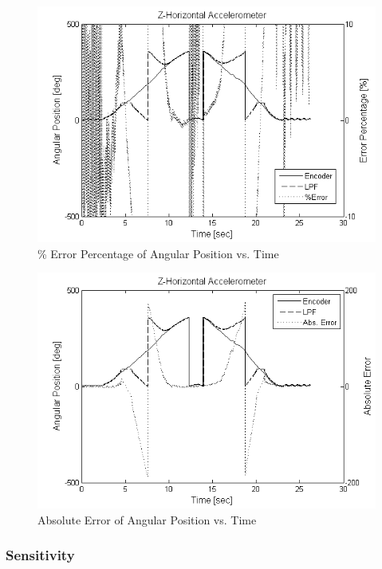 \documentclass{article}
\theoremstyle{plain}
\theoremstyle{definition}
\theoremstyle{remark}
\begin{document}
\begin{figure}[hbt]
\begin{center}
\includegraphics[width = 13cm]{Z_ErrorPercentage.png}
\caption{\% Error Percentage of Angular Position vs. Time}
\label{Z_ErrorPercentage}
\end{center}
\end{figure}

\begin{figure}[hbt]
\begin{center}
\includegraphics[width = 13cm]{Z_AbsError.png}
\caption{Absolute Error of Angular Position vs. Time}
\label{Z_AbsError}
\end{center}
\end{figure}

\subsubsection{Sensitivity}
\end{document}
